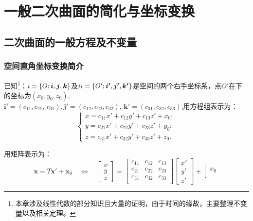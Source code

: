 \chapter{一般二次曲面的简化与坐标变换} 
\section{二次曲面的一般方程及不变量}
\thispagestyle{empty}
\subsection{空间直角坐标变换简介}
\tdefination[空间直角坐标变换公式]
已知\footnote{本章涉及线性代数的部分知识且大量的证明，由于时间的缘故，主要整理不变量以及相关定理。}：$\uppercase\expandafter{\romannumeral1}=\{O;\bm{i},\bm{j},\bm{k}\}$及$\uppercase\expandafter{\romannumeral2}=\{O';\bm{i'},\bm{j'},\bm{k'}\}$是空间的两个右手坐标系，点$O'$在\uppercase\expandafter{}下的坐标为$(x_0,y_0,z_0),\,$$\bm{i'}=(c_{11},c_{21},\,c_{31}),\bm{j'}=(c_{12},c_{22},c_{32}),\,\bm{k'}=(c_{31},c_{32},c_{33})$,用方程组表示为：
\begin{equation}
\label{坐标变换}
\begin{cases}
x = c_{11}x'+c_{12}y'+c_{13}z'+x_0;\\
y = c_{21}x'+c_{22}y'+c_{23}z'+y_0;\\
z = c_{31}x'+c_{32}y'+c_{33}z' +z_0.
\end{cases}
\end{equation}
\par 用矩阵表示为：
\begin{equation}
\label{坐标变换1}
\bm{x}=T\bm{x'}+\bm{x}_0 \quad \Longleftrightarrow \quad
\left[
\begin{array}{c}
x \\
y \\
z
\end{array}
\right]
=
\left[
\begin{array}{ccc}
c_{11} & c_{12} & c_{13} \\
c_{21} & c_{22} & c_{23} \\
c_{31} & c_{32} & c_{33} \\
\end{array}
\right]
\left[
\begin{array}{c}
x'\\
y' \\
z'
\end{array}
\right]
+
\left[
\begin{array}{c}
x_0 \\

\end{array}
\end{equation}$$
